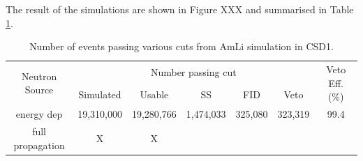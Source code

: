 \par
The result of the simulations are shown in Figure XXX and summarised in Table \ref{tab:amli_neutron_simulations_veto_efficiency}.

\begin{table}[!htbp]
    \centering
    \begin{tabular}{c|c|c|c|c|c|c}
         \multirow{2}{*}{Neutron Source} & \multicolumn{5}{c|}{Number passing cut}      & \multirow{2}{*}{Veto Eff. (\%)}  \\ 
                         & Simulated  & Usable     & SS        & FID     & Veto         &                                  \\ \hline
        energy dep       & 19,310,000 & 19,280,766 & 1,474,033 & 325,080 & 323,319      & 99.4                             \\
        full propagation & X          & X          &           &         &              & 
    \end{tabular}
    \caption{Number of events passing various cuts from AmLi simulation in CSD1.}
    \label{tab:amli_neutron_simulations_veto_efficiency}
\end{table}








